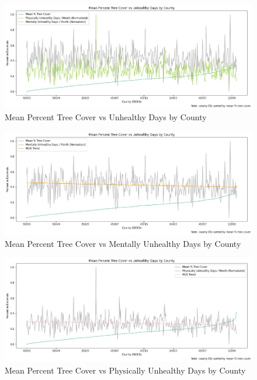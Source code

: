 \documentclass{article}
\begin{document}
\begin{figure}[H]
    \centering
\includegraphics[scale = 0.4]{mean_percent_tree_cover_phys_ment.png}
    \caption{Mean Percent Tree Cover vs Unhealthy Days by County}
    \label{fig:my_label}
\end{figure}

\begin{figure}[H]
    \centering
    \includegraphics[scale = 0.4]{mean_percent_unhealth.png}
    \caption{Mean Percent Tree Cover vs Mentally Unhealthy Days by County}
    \label{fig:my_label}
\end{figure}


\begin{figure}[H]
    \centering
    \includegraphics[scale = 0.4]{mean_percent_unhealth_ment.png}
    \caption{Mean Percent Tree Cover vs Physically Unhealthy Days by County}
    \label{fig:my_label}
\end{figure}
\end{document}

